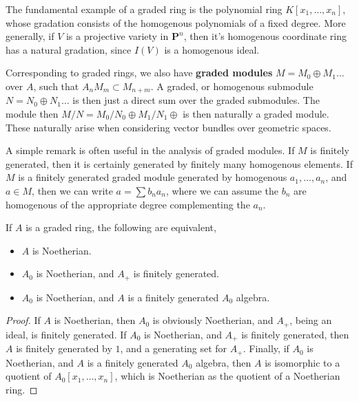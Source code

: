 \begin{example}
    The fundamental example of a graded ring is the polynomial ring $K[x_1, \dots, x_n]$, whose gradation consists of the homogenous polynomials of a fixed degree. More generally, if $V$ is a projective variety in $\mathbf{P}^n$, then it's homogenous coordinate ring has a natural gradation, since $I(V)$ is a homogenous ideal.
\end{example}

Corresponding to graded rings, we also have {\bf graded modules} $M = M_0 \oplus M_1 \dots$ over $A$, such that $A_n M_m \subset M_{n+m}$. A graded, or homogenous submodule $N = N_0 \oplus N_1 \dots$ is then just a direct sum over the graded submodules. The module then $M/N = M_0/N_0 \oplus M_1/N_1 \oplus$ is then naturally a graded module. These naturally arise when considering vector bundles over geometric spaces.

A simple remark is often useful in the analysis of graded modules. If $M$ is finitely generated, then it is certainly generated by finitely many homogenous elements. If $M$ is a finitely generated graded module generated by homogenous $a_1, \dots, a_n$, and $a \in M$, then we can write $a = \sum b_n a_n$, where we can assume the $b_n$ are homogenous of the appropriate degree complementing the $a_n$.

\begin{theorem}
    If $A$ is a graded ring, the following are equivalent,
    \begin{itemize}
        \item $A$ is Noetherian.
        \item $A_0$ is Noetherian, and $A_+$ is finitely generated.
        \item $A_0$ is Noetherian, and $A$ is a finitely generated $A_0$ algebra.
    \end{itemize}
\end{theorem}
\begin{proof}
    If $A$ is Noetherian, then $A_0$ is obviously Noetherian, and $A_+$, being an ideal, is finitely generated. If $A_0$ is Noetherian, and $A_+$ is finitely generated, then $A$ is finitely generated by $1$, and a generating set for $A_+$. Finally, if $A_0$ is Noetherian, and $A$ is a finitely generated $A_0$ algebra, then $A$ is isomorphic to a quotient of $A_0[x_1, \dots, x_n]$, which is Noetherian as the quotient of a Noetherian ring.
\end{proof}


